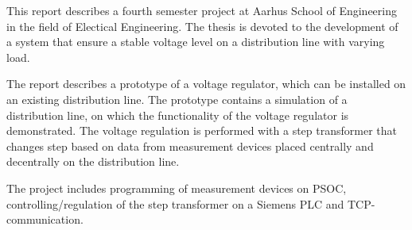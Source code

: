 
This report describes a fourth semester project at Aarhus School of Engineering in the field of Electical Engineering. The thesis is devoted to the development of a system that ensure a stable voltage level on a distribution line with varying load.

The report describes a prototype of a voltage regulator, which can be installed on an existing distribution line. The prototype contains a simulation of a distribution line, on which the functionality of the voltage regulator is demonstrated. The voltage regulation is performed with a step transformer that changes step based on data from measurement devices placed centrally and decentrally on the distribution line. 

The project includes programming of measurement devices on PSOC, controlling/regulation of the step transformer on a Siemens PLC and TCP-communication.


